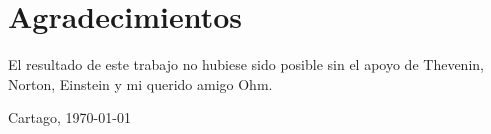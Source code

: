 \chapter*{Agradecimientos}
\thispagestyle{empty}

El resultado de este trabajo no hubiese sido posible sin el apoyo de Thevenin,
Norton, Einstein y mi querido amigo Ohm.

\vspace*{1cm}

\thesisAuthor

Cartago, \today

\cleardoublepage

